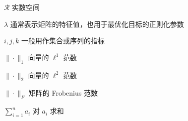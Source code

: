\begin{notation}
	
	\begin{notationlist}{2em}
		\item[$\mathcal{R}$] 实数空间
		\item[$\lambda$] 通常表示矩阵的特征值，也用于最优化目标的正则化参数
		\item[$i, j, k$] 一般用作集合或序列的指标
		\item[$\| \cdot \|_1$] 向量的 $\ell^1$ 范数
		\item[$\| \cdot \|_2$] 向量的 $\ell^2$ 范数
		\item[$\| \cdot \|_F$] 矩阵的 Frobenius 范数
		\item[$\displaystyle \sum_{i=1}^n a_i$] 对 $a_i$ 求和
	\end{notationlist}
	
\end{notation}